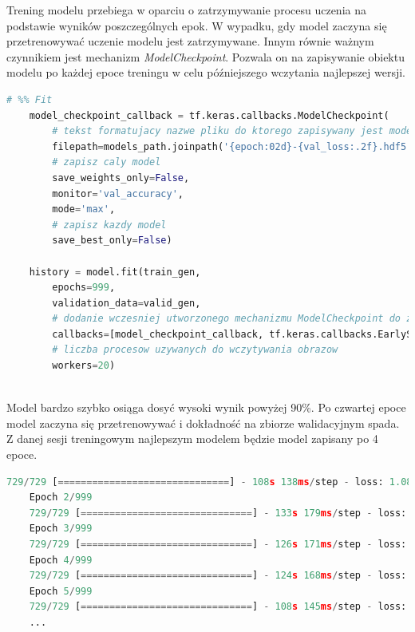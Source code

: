 \documentclass[a4paper,12pt,oneside]{book} %
\begin{document}
Trening modelu przebiega w oparciu o zatrzymywanie procesu uczenia na podstawie wyników poszczególnych epok. W wypadku, gdy model zaczyna się przetrenowywać uczenie modelu jest zatrzymywane. Innym równie ważnym czynnikiem jest mechanizm \emph{ModelCheckpoint}. Pozwala on na zapisywanie obiektu modelu po każdej epoce treningu w celu późniejszego wczytania najlepszej wersji.

\begin{lstlisting}[language=Python, caption={Trening modelu i mechanizmy \emph{Callback}}, label={lst:modeltrain}]
	# %% Fit
	model_checkpoint_callback = tf.keras.callbacks.ModelCheckpoint(
		# tekst formatujacy nazwe pliku do ktorego zapisywany jest model
		filepath=models_path.joinpath('{epoch:02d}-{val_loss:.2f}.hdf5'), 
		# zapisz caly model
		save_weights_only=False,
		monitor='val_accuracy', 
		mode='max',
		# zapisz kazdy model
		save_best_only=False)
	
	history = model.fit(train_gen,
		epochs=999,
		validation_data=valid_gen,
		# dodanie wczesniej utworzonego mechanizmu ModelCheckpoint do zapisywania modelu i EarlyStopping do zatrzymywania treningu po spadku precyzji
		callbacks=[model_checkpoint_callback, tf.keras.callbacks.EarlyStopping(patience=2)],
		# liczba procesow uzywanych do wczytywania obrazow
		workers=20)
	
\end{lstlisting}

Model bardzo szybko osiąga dosyć wysoki wynik powyżej 90\%. Po czwartej epoce model zaczyna się przetrenowywać i dokładność na zbiorze walidacyjnym spada. Z danej sesji treningowym najlepszym modelem będzie model zapisany po 4 epoce.

\begin{lstlisting}[language=Python, caption={Przykładowy trening modelu}, label={lst:modeltrainsession}]
	729/729 [==============================] - 108s 138ms/step - loss: 1.0876 - accuracy: 0.6626 - val_loss: 0.4911 - val_accuracy: 0.8657
	Epoch 2/999
	729/729 [==============================] - 133s 179ms/step - loss: 0.1650 - accuracy: 0.9452 - val_loss: 0.4953 - val_accuracy: 0.8691
	Epoch 3/999
	729/729 [==============================] - 126s 171ms/step - loss: 0.0786 - accuracy: 0.9738 - val_loss: 0.3581 - val_accuracy: 0.9114
	Epoch 4/999
	729/729 [==============================] - 124s 168ms/step - loss: 0.0497 - accuracy: 0.9839 - val_loss: 0.3348 - val_accuracy: 0.9203
	Epoch 5/999
	729/729 [==============================] - 108s 145ms/step - loss: 0.0386 - accuracy: 0.9871 - val_loss: 0.3579 - val_accuracy: 0.9043
	...
\end{lstlisting}
\end{document}
